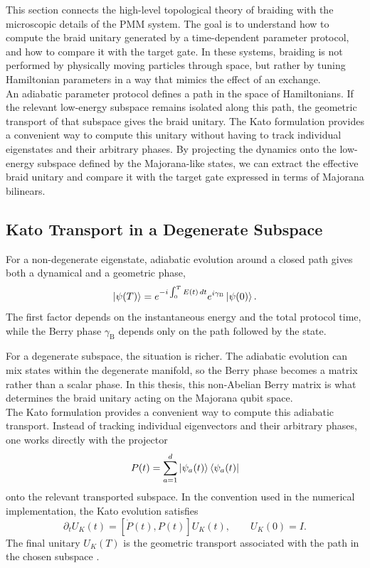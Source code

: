 This section connects the high-level topological theory of braiding with the microscopic details of the PMM system. The goal is to understand how to compute the braid unitary generated by a time-dependent parameter protocol, and how to compare it with the target gate. In these systems, braiding is not performed by physically moving particles through space, but rather by tuning Hamiltonian parameters in a way that mimics the effect of an exchange. \\ 
An adiabatic parameter protocol defines a path in the space of Hamiltonians. If the relevant low-energy subspace remains isolated along this path, the geometric transport of that subspace gives the braid unitary. The Kato formulation provides a convenient way to compute this unitary without having to track individual eigenstates and their arbitrary phases. By projecting the dynamics onto the low-energy subspace defined by the Majorana-like states, we can extract the effective braid unitary and compare it with the target gate expressed in terms of Majorana bilinears.\\

\subsection{Kato Transport in a Degenerate Subspace\newline}
For a non-degenerate eigenstate, adiabatic evolution around a closed path gives both a dynamical and a geometric phase,
\[
\ket{\psi(T)}
=
e^{-i\int_0^T E(t)\,dt}
e^{i\gamma_{\mathrm{B}}}
\ket{\psi(0)} .
\]
The first factor depends on the instantaneous energy and the total protocol time, while the Berry phase $\gamma_{\mathrm{B}}$ depends only on the path followed by the state.

For a degenerate subspace, the situation is richer. The adiabatic evolution can mix states within the degenerate manifold, so the Berry phase becomes a matrix rather than a scalar phase. In this thesis, this non-Abelian Berry matrix is what determines the braid unitary acting on the Majorana qubit space.\\

The Kato formulation provides a convenient way to compute this adiabatic transport. Instead of tracking individual eigenvectors and their arbitrary phases, one works directly with the projector
\[
P(t)=\sum_{a=1}^{d}\ket{\psi_a(t)}\bra{\psi_a(t)}
\]
onto the relevant transported subspace. In the convention used in the numerical implementation, the Kato evolution satisfies
\[
\partial_t U_K(t)
=
[\dot P(t),P(t)]U_K(t),
\qquad
U_K(0)=I .
\]
The final unitary $U_K(T)$ is the geometric transport associated with the path in the chosen subspace \cite{katoAdiabaticTheoremQuantum1950}.

